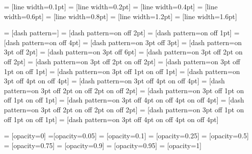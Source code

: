 =              [line width=0.1pt]
=               [line width=0.2pt]
=                    [line width=0.4pt]
=               [line width=0.6pt]
=                   [line width=0.8pt]
=              [line width=1.2pt]
=             [line width=1.6pt]

=                   [dash pattern=]
=                  [dash pattern=on \pgflinewidth off 2pt]
=          [dash pattern=on \pgflinewidth off 1pt]
=          [dash pattern=on \pgflinewidth off 4pt]
=                  [dash pattern=on 3pt off 3pt]
=          [dash pattern=on 3pt off 2pt]
=          [dash pattern=on 3pt off 6pt]
=              [dash pattern=on 3pt off 2pt on \the\pgflinewidth off 2pt]
=                [dash pattern=on 3pt off 2pt on \the\pgflinewidth off 2pt]
=      [dash pattern=on 3pt off 1pt on \the\pgflinewidth off 1pt]
=        [dash pattern=on 3pt off 1pt on \the\pgflinewidth off 1pt]
=      [dash pattern=on 3pt off 4pt on \the\pgflinewidth off 4pt]
=        [dash pattern=on 3pt off 4pt on \the\pgflinewidth off 4pt]
=           [dash pattern=on 3pt off 2pt on \the\pgflinewidth off 2pt on \the\pgflinewidth off 2pt]
=   [dash pattern=on 3pt off 1pt on \the\pgflinewidth off 1pt on \the\pgflinewidth off 1pt]
=   [dash pattern=on 3pt off 4pt on \the\pgflinewidth off 4pt on \the\pgflinewidth off 4pt]
=         [dash pattern=on 3pt off 2pt on \the\pgflinewidth off 2pt on \the\pgflinewidth off 2pt]
=   [dash pattern=on 3pt off 1pt on \the\pgflinewidth off 1pt on \the\pgflinewidth off 1pt]
=   [dash pattern=on 3pt off 4pt on \the\pgflinewidth off 4pt on \the\pgflinewidth off 4pt]


=             [opacity=0]
=[opacity=0.05]
= [opacity=0.1]
=      [opacity=0.25]
=         [opacity=0.5]
=           [opacity=0.75]
=      [opacity=0.9]
=     [opacity=0.95]
=                  [opacity=1]

